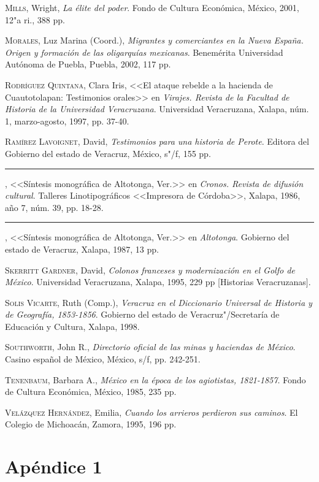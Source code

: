 \documentclass[14pt,twoside,final]{extbook} %
\begin{document}
\textsc{Mills}, Wright, \emph{La élite del poder}. Fondo de Cultura Económica, México, 2001, 12"a ri., 388 pp.

\textsc{Morales}, Luz Marina (Coord.), \emph{Migrantes y comerciantes en la Nueva España. Origen y formación de las oligarquías mexicanas}. Benemérita Universidad Autónoma de Puebla, Puebla, 2002, 117 pp.

\textsc{Rodríguez Quintana}, Clara Iris, <<El ataque rebelde a la hacienda de Cuautotolapan: Testimonios orales>> en \emph{Virajes. Revista de la Facultad de Historia de la Universidad Veracruzana}. Universidad Veracruzana, Xalapa, núm. 1, marzo-agosto, 1997, pp. 37-40.

\textsc{Ramírez Lavoignet}, David, \emph{Testimonios para una historia de Perote}. Editora del Gobierno del estado de Veracruz, México, s"/f, 155 pp.

\rule{1cm}{0.4pt}, <<Síntesis monográfica de Altotonga, Ver.>> en \emph{Cronos. Revista de difusión cultural}. Talleres Linotipográficos <<Impresora de Córdoba>>, Xalapa, 1986,
año 7, núm. 39, pp. 18-28.

\rule{1cm}{0.4pt}, <<Síntesis monográfica de Altotonga, Ver.>> en \emph{Altotonga}. Gobierno del estado de Veracruz, Xalapa, 1987, 13 pp.

\textsc{Skerritt Gardner}, David, \emph{Colonos franceses y modernización en el Golfo de México}. Universidad Veracruzana, Xalapa, 1995, 229 pp [Historias Veracruzanas].

\textsc{Solis Vicarte}, Ruth (Comp.), \emph{Veracruz en el Diccionario Universal de Historia y de Geografía, 1853-1856}. Gobierno del estado de Veracruz"/Secretaría de Educación y Cultura, Xalapa, 1998.

\textsc{Southworth}, John R., \emph{Directorio oficial de las minas y haciendas de México}. Casino español de México, México, s/f, pp. 242-251.

\textsc{Tenenbaum}, Barbara A., \emph{México en la época de los agiotistas, 1821-1857}. Fondo de Cultura Económica, México, 1985, 235 pp.

\textsc{Velázquez Hernández}, Emilia, \emph{Cuando los arrieros perdieron sus caminos}. El Colegio de Michoacán, Zamora, 1995, 196 pp.
\appendix
\chapter{Apéndice 1}\label{ap:apendice-one}
\thispagestyle{empty}
\pagestyle{fancy}
\fancyhf{} %
\fancyhead[RO,LE]{\thepage}
\renewcommand{\headrulewidth}{0pt}
\setcounter{page}{137}
\end{document}
